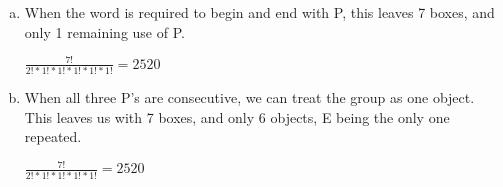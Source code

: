 \documentclass[11pt]{article}
\begin{document}
\begin{enumerate}
\begin{enumerate}[(a)]
			\item When the word is required to begin and end with P,
				this leaves 7 boxes, and only 1 remaining use of P.

				$\frac{7!}{2!*1!*1!*1!*1!*1!} = 2520$

			\item When all three P's are consecutive, we can treat the
				group as one object. This leaves us with 7 boxes,
				and only 6 objects, E being the only one repeated.

				$\frac{7!}{2!*1!*1!*1!*1!} = 2520$

		\end{enumerate}

\end{enumerate}
\end{document}

